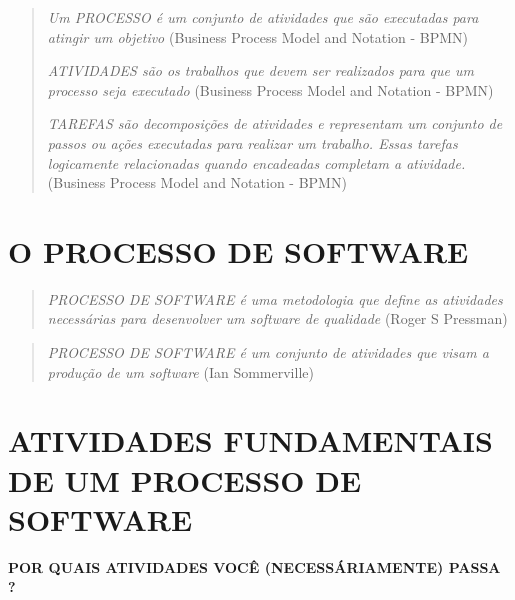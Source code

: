 \documentclass[
]{book}
\begin{document}
\begin{quote}
\emph{Um PROCESSO é um conjunto de atividades que são executadas para atingir um objetivo} (Business Process Model and Notation - BPMN)

\emph{ATIVIDADES são os trabalhos que devem ser realizados para que um processo seja executado} (Business Process Model and Notation - BPMN)

\emph{TAREFAS são decomposições de atividades e representam um conjunto de passos ou ações executadas para realizar um trabalho. Essas tarefas logicamente relacionadas quando encadeadas completam a atividade.} (Business Process Model and Notation - BPMN)
\end{quote}

\section{O PROCESSO DE SOFTWARE}\label{o-processo-de-software}

\begin{quote}
\emph{PROCESSO DE SOFTWARE é uma metodologia que define as atividades necessárias para desenvolver um software de qualidade} (Roger S Pressman)
\end{quote}

\begin{quote}
\emph{PROCESSO DE SOFTWARE é um conjunto de atividades que visam a produção de um software} (Ian Sommerville)
\end{quote}

\section{ATIVIDADES FUNDAMENTAIS DE UM PROCESSO DE SOFTWARE}\label{atividades-fundamentais-de-um-processo-de-software}

\textbf{POR QUAIS ATIVIDADES VOCÊ (NECESSÁRIAMENTE) PASSA ?}
\end{document}

